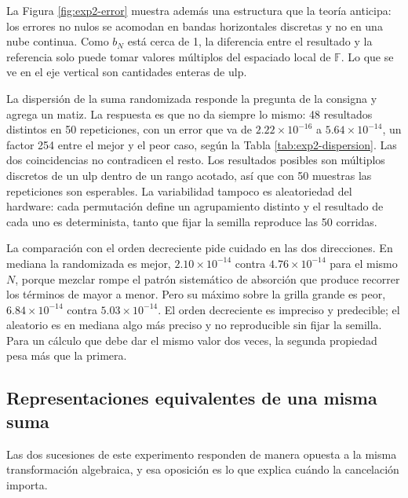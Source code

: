 La Figura \ref{fig:exp2-error} muestra además una estructura que la teoría anticipa: los errores no
nulos se acomodan en bandas horizontales discretas y no en una nube continua. Como $b_N$ está cerca
de 1, la diferencia entre el resultado y la referencia solo puede tomar valores múltiplos del
espaciado local de $\mathbb{F}$. Lo que se ve en el eje vertical son
cantidades enteras de ulp.

La dispersión de la suma randomizada responde la pregunta de la consigna y agrega un matiz. La
respuesta es que no da siempre lo mismo: 48 resultados distintos en 50 repeticiones, con un error
que va de $2.22 \times 10^{-16}$ a $5.64 \times 10^{-14}$, un factor 254 entre el mejor y el peor
caso, según la Tabla \ref{tab:exp2-dispersion}. Las dos coincidencias no contradicen el resto. Los
resultados posibles son múltiplos discretos de un ulp dentro de un rango acotado, así que con 50
muestras las repeticiones son esperables. La variabilidad tampoco es aleatoriedad del hardware: cada
permutación define un agrupamiento distinto y el resultado de cada uno es determinista, tanto que
fijar la semilla reproduce las 50 corridas.

La comparación con el orden decreciente pide cuidado en las dos direcciones. En mediana la
randomizada es mejor, $2.10 \times 10^{-14}$ contra $4.76 \times 10^{-14}$ para el mismo $N$, porque
mezclar rompe el patrón sistemático de absorción que produce recorrer los términos de mayor a menor.
Pero su máximo sobre la grilla grande es peor, $6.84 \times 10^{-14}$ contra
$5.03 \times 10^{-14}$. El orden decreciente es impreciso y predecible; el aleatorio es en mediana
algo más preciso y no reproducible sin fijar la semilla. Para un cálculo que debe dar el mismo valor dos
veces, la segunda propiedad pesa más que la primera.

\subsection{Representaciones equivalentes de una misma suma}
\label{subsec:dis-representaciones}

Las dos sucesiones de este experimento responden de manera opuesta a la misma transformación
algebraica, y esa oposición es lo que explica cuándo la cancelación importa.

